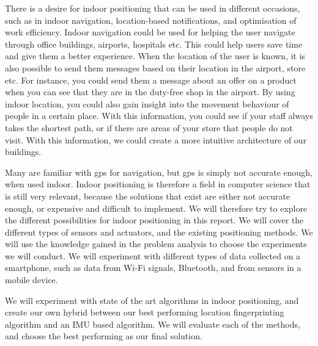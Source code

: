 
There is a desire for indoor positioning that can be used in different occasions, such as in indoor navigation, location-based notifications, and optimisation of work efficiency. Indoor navigation could be used for helping the user navigate through office buildings, airports, hospitals etc. This could help users save time and give them a better experience. When the location of the user is known, it is also possible to send them messages based on their location in the airport, store etc. For instance, you could send them a message about an offer on a product when you can see that they are in the duty-free shop in the airport. By using indoor location, you could also gain insight into the movement behaviour of people in a certain place. With this information, you could see if your staff always takes the shortest path, or if there are areas of your store that people do not visit. With this information, we could create a more intuitive architecture of our buildings.\cite{IPSMapsPeople}

Many are familiar with \gls{gps} for navigation, but \gls{gps} is simply not accurate enough, when used indoor. Indoor positioning is therefore a field in computer science that is still very relevant, because the solutions that exist are either not accurate enough, or expensive and difficult to implement. We will therefore try to explore the different possibilities for indoor positioning in this report. We will cover the different types of sensors and actuators, and the existing positioning methods. We will use the knowledge gained in the problem analysis to choose the experiments we will conduct. We will experiment with different types of data collected on a smartphone, such as data from Wi-Fi signals, Bluetooth, and from sensors in a mobile device. 

We will experiment with state of the art algorithms in indoor positioning, and create our own hybrid between our best performing location fingerprinting algorithm and an IMU based algorithm. We will evaluate each of the methods, and choose the best performing as our final solution. 


